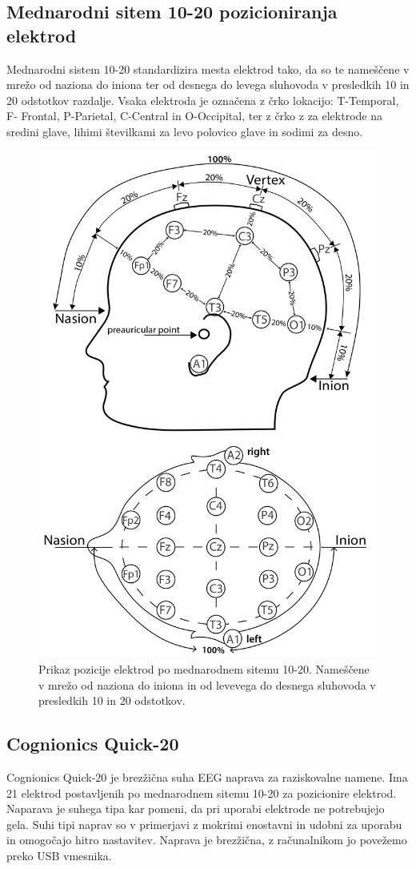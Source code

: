 \subsection{Mednarodni sitem 10-20 pozicioniranja elektrod}
Mednarodni sistem 10-20 standardizira mesta elektrod tako, da so te  nameščene v mrežo od naziona do iniona ter od desnega do levega sluhovoda v presledkih 10 in 20 odstotkov razdalje. Vsaka elektroda je označena z črko lokacijo: T-Temporal, F- Frontal, P-Parietal, C-Central in O-Occipital, ter z črko z za elektrode na sredini glave, lihimi številkami za levo polovico glave in sodimi za desno. \cite{klemTentwentyElectrodeSystem1999}
\begin{figure}[h!]
    \begin{center}
    \includegraphics[width=0.7\linewidth]{slike/1020-diagram1.jpg}
    \end{center}
    \caption{Prikaz pozicije elektrod po mednarodnem sitemu 10-20. Nameščene v mrežo od naziona do iniona in od levevega do desnega sluhovoda v presledkih 10 in 20 odstotkov. \cite{ElectrodeArrangementAccording}}
    \end{figure}


\subsection{Cognionics Quick-20}
Cognionics Quick-20 je brezžična suha EEG naprava za raziskovalne namene. Ima 21 elektrod postavljenih po mednarodnem sitemu 10-20 za pozicionire elektrod. Naparava je suhega tipa kar pomeni, da pri uporabi elektrode ne potrebujejo gela. Suhi tipi naprav so v primerjavi z mokrimi enostavni in udobni za uporabu in omogočajo hitro nastavitev. Naprava je brezžična, z računalnikom jo povežemo preko USB vmesnika. \cite{DryEEGHeadset}

